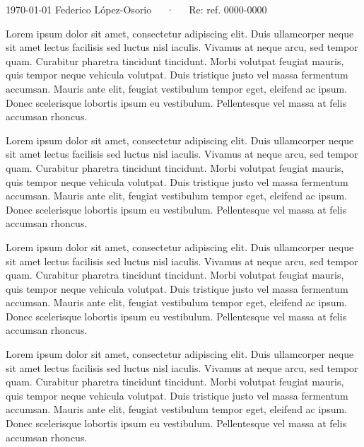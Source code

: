 \documentclass[11pt, a4paper]{awesome-cv}
\begin{document}
\rightline{\makecvheader[R]}

\makecvfooter
  {\today}
  {Federico L\'opez-Osorio~~~·~~~Re: ref. 0000-0000}
  {}

\makelettertitle

\begin{cvletter}

Lorem ipsum dolor sit amet, consectetur adipiscing elit. Duis ullamcorper neque 
sit amet lectus facilisis sed luctus nisl iaculis. Vivamus at neque arcu, sed 
tempor quam. Curabitur pharetra tincidunt tincidunt. Morbi volutpat feugiat 
mauris, quis tempor neque vehicula volutpat. Duis tristique justo vel massa 
fermentum accumsan. Mauris ante elit, feugiat vestibulum tempor eget, eleifend 
ac ipsum. Donec scelerisque lobortis ipsum eu vestibulum. Pellentesque vel 
massa at felis accumsan rhoncus.

Lorem ipsum dolor sit amet, consectetur adipiscing elit. Duis ullamcorper neque 
sit amet lectus facilisis sed luctus nisl iaculis. Vivamus at neque arcu, sed 
tempor quam. Curabitur pharetra tincidunt tincidunt. Morbi volutpat feugiat 
mauris, quis tempor neque vehicula volutpat. Duis tristique justo vel massa 
fermentum accumsan. Mauris ante elit, feugiat vestibulum tempor eget, eleifend 
ac ipsum. Donec scelerisque lobortis ipsum eu vestibulum. Pellentesque vel 
massa at felis accumsan rhoncus.

Lorem ipsum dolor sit amet, consectetur adipiscing elit. Duis ullamcorper neque 
sit amet lectus facilisis sed luctus nisl iaculis. Vivamus at neque arcu, sed 
tempor quam. Curabitur pharetra tincidunt tincidunt. Morbi volutpat feugiat 
mauris, quis tempor neque vehicula volutpat. Duis tristique justo vel massa 
fermentum accumsan. Mauris ante elit, feugiat vestibulum tempor eget, eleifend 
ac ipsum. Donec scelerisque lobortis ipsum eu vestibulum. Pellentesque vel 
massa at felis accumsan rhoncus.

Lorem ipsum dolor sit amet, consectetur adipiscing elit. Duis ullamcorper neque 
sit amet lectus facilisis sed luctus nisl iaculis. Vivamus at neque arcu, sed 
tempor quam. Curabitur pharetra tincidunt tincidunt. Morbi volutpat feugiat 
mauris, quis tempor neque vehicula volutpat. Duis tristique justo vel massa 
fermentum accumsan. Mauris ante elit, feugiat vestibulum tempor eget, eleifend 
ac ipsum. Donec scelerisque lobortis ipsum eu vestibulum. Pellentesque vel 
massa at felis accumsan rhoncus.

\end{cvletter}


\makeletterclosing
\end{document}
